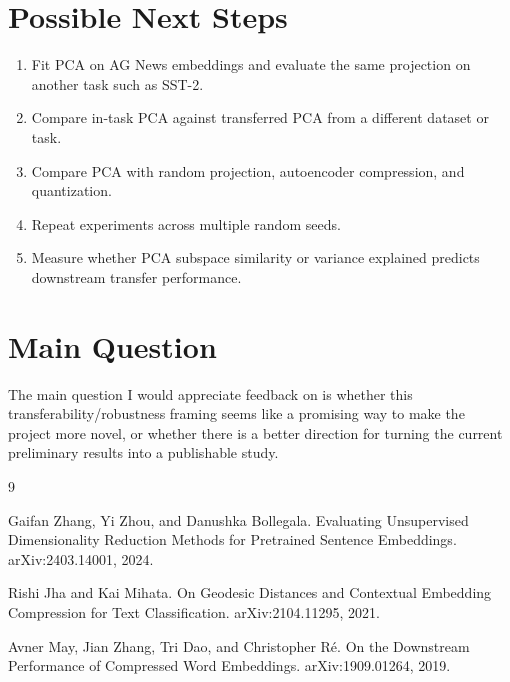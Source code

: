 \documentclass[11pt]{article}
\begin{document}
\section{Possible Next Steps}

\begin{enumerate}
    \item Fit PCA on AG News embeddings and evaluate the same projection on another task such as SST-2.
    \item Compare in-task PCA against transferred PCA from a different dataset or task.
    \item Compare PCA with random projection, autoencoder compression, and quantization.
    \item Repeat experiments across multiple random seeds.
    \item Measure whether PCA subspace similarity or variance explained predicts downstream transfer performance.
\end{enumerate}

\section{Main Question}

The main question I would appreciate feedback on is whether this transferability/robustness framing seems like a promising way to make the project more novel, or whether there is a better direction for turning the current preliminary results into a publishable study.

\begin{thebibliography}{9}

Gaifan Zhang, Yi Zhou, and Danushka Bollegala.
\newblock Evaluating Unsupervised Dimensionality Reduction Methods for Pretrained Sentence Embeddings.
\newblock arXiv:2403.14001, 2024.

Rishi Jha and Kai Mihata.
\newblock On Geodesic Distances and Contextual Embedding Compression for Text Classification.
\newblock arXiv:2104.11295, 2021.

Avner May, Jian Zhang, Tri Dao, and Christopher R\'e.
\newblock On the Downstream Performance of Compressed Word Embeddings.
\newblock arXiv:1909.01264, 2019.

\end{thebibliography}
\end{document}

